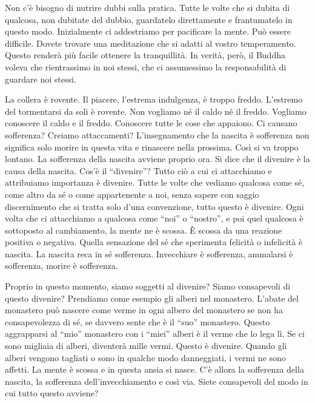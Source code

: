 Non c'è bisogno di nutrire dubbi sulla pratica. Tutte le volte che si
dubita di qualcosa, non dubitate del dubbio, guardatelo direttamente e
frantumatelo in questo modo. Inizialmente ci addestriamo per pacificare
la mente. Può essere difficile. Dovete trovare una meditazione che si
adatti al vostro temperamento. Questo renderà più facile ottenere la
tranquillità. In verità, però, il Buddha voleva che rientrassimo in noi
stessi, che ci assumessimo la responsabilità di guardare noi stessi.

La collera è rovente. Il piacere, l'estrema indulgenza, è troppo freddo.
L'estremo del tormentarsi da soli è rovente. Non vogliamo né il caldo né
il freddo. Vogliamo conoscere il caldo e il freddo. Conoscere tutte le
cose che appaiono. Ci causano sofferenza? Creiamo attaccamenti?
L'insegnamento che la nascita è sofferenza non significa solo morire in
questa vita e rinascere nella prossima. Così si va troppo lontano. La
sofferenza della nascita avviene proprio ora. Si dice che il divenire è
la causa della nascita. Cos'è il ``divenire''? Tutto ciò a cui ci
attacchiamo e attribuiamo importanza è divenire. Tutte le volte che
vediamo qualcosa come sé, come altro da sé o come appartenente a noi,
senza sapere con saggio discernimento che si tratta solo d'una
convenzione, tutto questo è divenire. Ogni volta che ci attacchiamo a
qualcosa come ``noi'' o ``nostro'', e poi quel qualcosa è sottoposto al
cambiamento, la mente ne è scossa. È scossa da una reazione positiva o
negativa. Quella sensazione del sé che sperimenta felicità o infelicità
è nascita. La nascita reca in sé sofferenza. Invecchiare è sofferenza,
ammalarsi è sofferenza, morire è sofferenza.

Proprio in questo momento, siamo soggetti al divenire? Siamo consapevoli
di questo divenire? Prendiamo come esempio gli alberi nel monastero.
L'abate del monastero può nascere come verme in ogni albero del
monastero se non ha consapevolezza di sé, se davvero sente che è il
``suo'' monastero. Questo aggrapparsi al ``mio'' monastero con i
``miei'' alberi è il verme che lo lega lì. Se ci sono migliaia di
alberi, diventerà mille vermi. Questo è divenire. Quando gli alberi
vengono tagliati o sono in qualche modo danneggiati, i vermi ne sono
affetti. La mente è scossa e in questa ansia si nasce. C'è allora la
sofferenza della nascita, la sofferenza dell'invecchiamento e così via.
Siete consapevoli del modo in cui tutto questo avviene?

